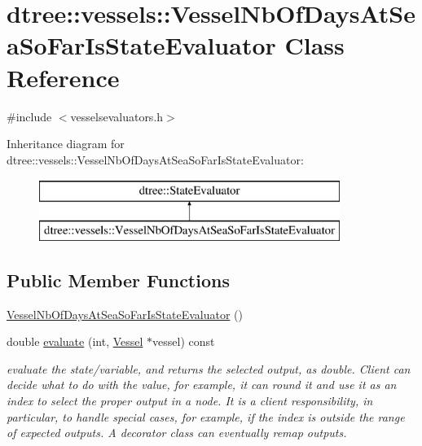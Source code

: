 \hypertarget{classdtree_1_1vessels_1_1_vessel_nb_of_days_at_sea_so_far_is_state_evaluator}{}\section{dtree\+::vessels\+::Vessel\+Nb\+Of\+Days\+At\+Sea\+So\+Far\+Is\+State\+Evaluator Class Reference}
\label{classdtree_1_1vessels_1_1_vessel_nb_of_days_at_sea_so_far_is_state_evaluator}


{\ttfamily \#include $<$vesselsevaluators.\+h$>$}

Inheritance diagram for dtree\+::vessels\+::Vessel\+Nb\+Of\+Days\+At\+Sea\+So\+Far\+Is\+State\+Evaluator\+:\begin{figure}[H]
\begin{center}
\leavevmode
\includegraphics[height=2.000000cm]{d7/dab/classdtree_1_1vessels_1_1_vessel_nb_of_days_at_sea_so_far_is_state_evaluator}
\end{center}
\end{figure}
\subsection*{Public Member Functions}
\begin{DoxyCompactItemize}
\item 
\mbox{\hyperlink{classdtree_1_1vessels_1_1_vessel_nb_of_days_at_sea_so_far_is_state_evaluator_a07e2c86540e776c9e0b22f094593ba2b}{Vessel\+Nb\+Of\+Days\+At\+Sea\+So\+Far\+Is\+State\+Evaluator}} ()
\item 
double \mbox{\hyperlink{classdtree_1_1vessels_1_1_vessel_nb_of_days_at_sea_so_far_is_state_evaluator_ae8d2c466b6454ad0e43a2a2b810dfe31}{evaluate}} (int, \mbox{\hyperlink{class_vessel}{Vessel}} $\ast$vessel) const
\begin{DoxyCompactList}\small\item\em evaluate the state/variable, and returns the selected output, as double. Client can decide what to do with the value, for example, it can round it and use it as an index to select the proper output in a node. It is a client responsibility, in particular, to handle special cases, for example, if the index is outside the range of expected outputs. A decorator class can eventually remap outputs. \end{DoxyCompactList}\end{DoxyCompactItemize}


